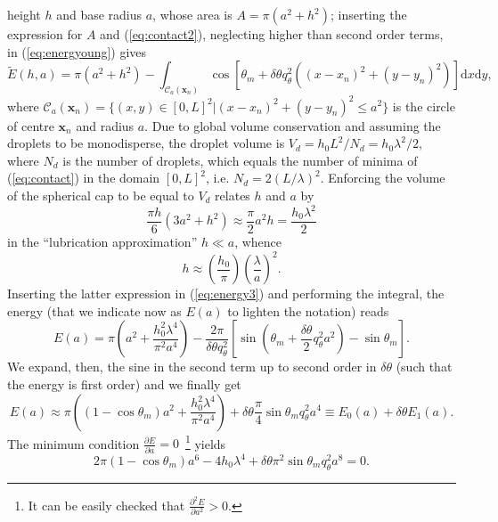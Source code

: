 \documentclass[amsmath,amssymb,showpacs,prl,superscriptaddress,notitlepage]{revtex4-1}
\begin{document}
height $h$ and base radius $a$, whose area is $A = \pi(a^2 + h^2)$; inserting the expression for
$A$ and (\ref{eq:contact2}), neglecting higher than second order terms, in (\ref{eq:energyoung}) gives
\begin{equation}\label{eq:energy3}
  \tilde{E}(h,a) = \pi(a^2 + h^2) -
  \int_{\mathcal{C}_a(\mathbf{x}_n)} \cos\left[\theta_m + \delta \theta q_{\theta}^2 ((x-x_n)^2 + (y - y_n)^2)\right]
    \text{d}x\text{d}y,
\end{equation}  
where
$\mathcal{C}_a(\mathbf{x}_n)=\{(x,y) \in [0, L]^2|(x-x_n)^2 + (y-y_n)^2 \leq a^2\}$
is the circle of centre $\mathbf{x}_n$ and radius $a$. 
Due to global volume conservation and assuming the droplets to be monodisperse, the droplet
volume is $V_d = h_0L^2/N_d = h_0 \lambda^2/2$,
where $N_d$ is the number of droplets, which equals the number of
minima of (\ref{eq:contact}) in the domain $[0, L]^2$, i.e. $N_d = 2(L/\lambda)^2$.
Enforcing the volume of the spherical cap to be equal to $V_d$ relates $h$ and $a$ by
\begin{equation}
\frac{\pi h}{6}(3a^2 + h^2) \approx \frac{\pi}{2} a^2 h =  \frac{h_0 \lambda^2}{2}    
\end{equation}
in the ``lubrication approximation'' $h \ll a$, whence
\begin{equation}
  h \approx \left(\frac{h_0}{\pi}\right) \left(\frac{\lambda}{a}\right)^2.
\end{equation}  
Inserting the latter expression in (\ref{eq:energy3}) and performing the integral, the
energy (that we indicate now as $E(a)$ to lighten the notation) reads
\begin{equation}\label{eq:energy4}
  E(a) = \pi \left(a^2 + \frac{h_0^2 \lambda^4}{\pi^2 a^4} \right) - \frac{2\pi}{\delta \theta q_{\theta}^2}
  \left[\sin\left(\theta_m +\frac{\delta \theta}{2}q_{\theta}^2a^2\right) - \sin \theta_m \right].
\end{equation}  
We expand, then, the sine in the second term up to second order in $\delta \theta$ (such that the
energy is first order) and we finally get
\begin{equation}\label{eq:energyfin}
  E(a) \approx  \pi \left((1-\cos \theta_m) a^2 + \frac{h_0^2 \lambda^4}{\pi^2 a^4} \right)
  + \delta \theta \frac{\pi}{4}\sin \theta_m q_{\theta}^2 a^4 \equiv E_0(a) + \delta \theta E_1(a).
\end{equation}  
The minimum condition $\frac{\partial E}{\partial a} = 0$~\footnote{It can be easily checked that 
$\frac{\partial^2 E}{\partial a^2} > 0$.} yields  
\begin{equation}\label{eq:minim}
2\pi (1-\cos \theta_m)a^6 - 4h_0 \lambda^4 + \delta \theta \pi^2 \sin \theta_m q_{\theta}^2 a^8 =0.
\end{equation}  
\end{document}
